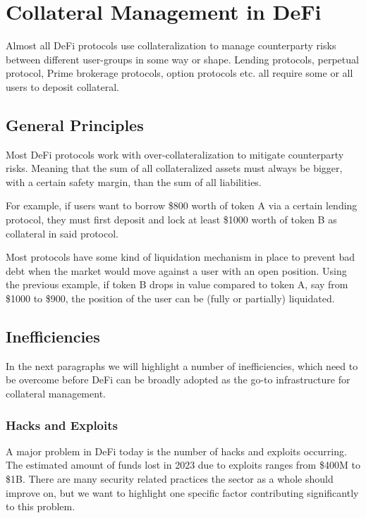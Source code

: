\documentclass[sigconf,nonacm]{acmart}
\begin{document}
\section{Collateral Management in DeFi}
\label{sec:collateral-management-in-DeFi}
Almost all DeFi protocols use collateralization to manage counterparty risks between different user-groups in some way or shape.
Lending protocols, perpetual protocol, Prime brokerage protocols, option protocols etc. all require some or all users to deposit collateral.

\subsection{General Principles}
Most DeFi protocols work with over-collateralization to mitigate counterparty risks.
Meaning that the sum of all collateralized assets must always be bigger, with a certain safety margin, than the sum of all liabilities.

For example, if users want to borrow \$800 worth of token A via a certain lending protocol,
they must first deposit and lock at least \$1000 worth of token B as collateral in said protocol.

Most protocols have some kind of liquidation mechanism in place to prevent bad debt when the market would move against a user with an open position.
Using the previous example, if token B drops in value compared to token A, say from \$1000 to \$900,
the position of the user can be (fully or partially) liquidated.

\subsection{Inefficiencies}
\label{subsec:inefficiencies}

In the next paragraphs we will highlight a number of inefficiencies,
which need to be overcome before DeFi can be broadly adopted as the go-to infrastructure for collateral management.

\subsubsection{Hacks and Exploits}
\label{subsubsec:hacks-and-exploits}

A major problem in DeFi today is the number of hacks and exploits occurring.
The estimated amount of funds lost in 2023 due to exploits ranges from \$400M to \$1B.
There are many security related practices the sector as a whole should improve on,
but we want to highlight one specific factor contributing significantly to this problem.
\end{document}
